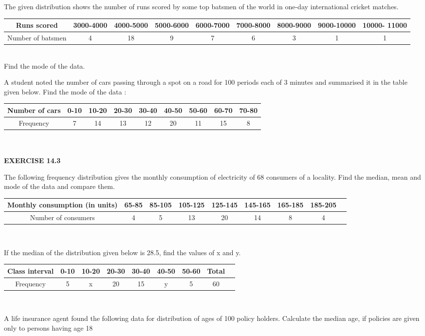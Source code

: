 \item The given distribution shows the number of runs scored by some top batsmen of the
world in one-day international cricket matches.
\begin{tabular}{|c|c|c|c|c|c|c|c|c|}
\hline
Runs scored&3000-4000&4000-5000&5000-6000&6000-7000&7000-8000&8000-9000&9000-10000&10000- 11000\\
\hline
Number of batsmen&4&18&9&7&6&3&1&1\\
\hline
\end{tabular}\\
Find the mode of the data.
\item A student noted the number of cars passing through a spot on a road for 100
periods each of 3 minutes and summarised it in the table given below. Find the mode
of the data :
\begin{tabular}{|c|c|c|c|c|c|c|c|c|}
\hline
Number of cars&0-10&10-20&20-30&30-40&40-50&50-60&60-70&70-80\\
\hline
Frequency&7&14&13&12&20&11&15&8\\
\hline
\end{tabular}\\\\
{\Large \textbf{EXERCISE 14.3}}
\item The following frequency distribution gives the monthly consumption of electricity of
68 consumers of a locality. Find the median, mean and mode of the data and compare
them.
\begin{tabular}{|c|c|c|c|c|c|c|c|c|}
\hline
Monthly consumption (in units)&65-85&85-105&105-125&125-145&145-165&165-185&185-205\\
\hline
Number of consumers&4&5&13&20&14&8&4\\
\hline
\end{tabular}\\
\item If the median of the distribution given below is 28.5, find the values of x and y.
\begin{tabular}{|c|c|c|c|c|c|c|c|c|}
\hline
Class interval&0-10&10-20&20-30&30-40&40-50&50-60& Total\\
\hline
Frequency&5&x&20&15&y&5&60\\
\hline
\end{tabular}\\
\item A life insurance agent found the following data for distribution of ages of 100 policy
holders. Calculate the median age, if policies are given only to persons having age 18
